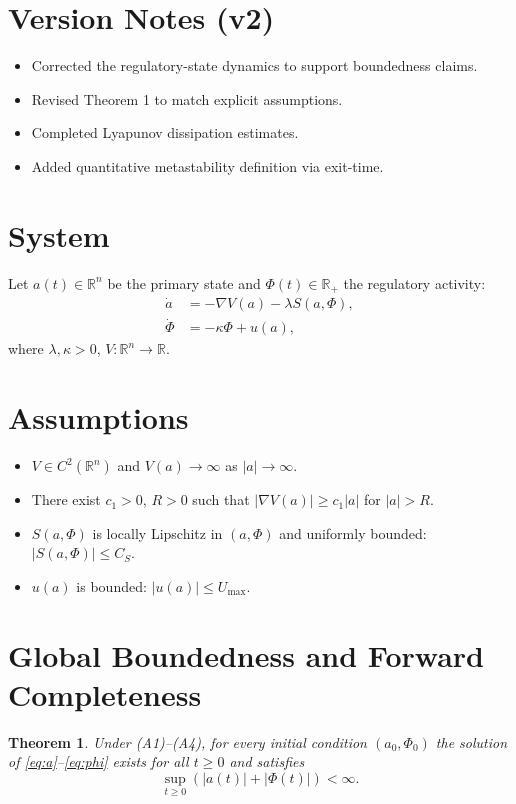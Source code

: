 ﻿\documentclass[12pt,a4paper]{article}
\newtheorem{theorem}{Theorem}
\begin{document}
\section*{Version Notes (v2)}
\begin{itemize}
    \item Corrected the regulatory-state dynamics to support boundedness claims.
    \item Revised Theorem 1 to match explicit assumptions.
    \item Completed Lyapunov dissipation estimates.
    \item Added quantitative metastability definition via exit-time.
\end{itemize}

\section{System}
Let $a(t)\in\mathbb{R}^n$ be the primary state and $\Phi(t)\in\mathbb{R}_+$ the regulatory activity:
\begin{align}
\dot{a} &= -\nabla V(a)-\lambda S(a,\Phi), \label{eq:a}\\
\dot{\Phi} &= -\kappa \Phi + u(a), \label{eq:phi}
\end{align}
where $\lambda,\kappa>0$, $V:\mathbb{R}^n\to\mathbb{R}$.

\section{Assumptions}
\begin{itemize}
    \item[(A1)] $V\in C^2(\mathbb{R}^n)$ and $V(a)\to\infty$ as $|a|\to\infty$.
    \item[(A2)] There exist $c_1>0$, $R>0$ such that $|\nabla V(a)|\ge c_1|a|$ for $|a|>R$.
    \item[(A3)] $S(a,\Phi)$ is locally Lipschitz in $(a,\Phi)$ and uniformly bounded: $|S(a,\Phi)|\le C_S$.
    \item[(A4)] $u(a)$ is bounded: $|u(a)|\le U_{\max}$.
\end{itemize}

\section{Global Boundedness and Forward Completeness}
\begin{theorem}
Under (A1)--(A4), for every initial condition $(a_0,\Phi_0)$ the solution of \eqref{eq:a}--\eqref{eq:phi} exists for all $t\ge 0$ and satisfies
\[
\sup_{t \ge 0}\left(|a(t)|+|\Phi(t)|\right)<\infty.
\]
\end{theorem}
\end{document}
